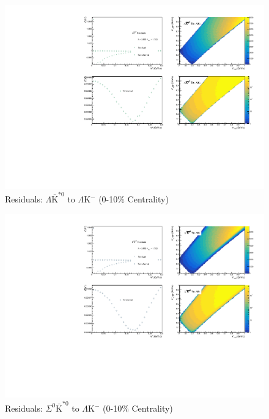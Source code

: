 \documentclass[../AnalysisNoteJBuxton.tex]{subfiles}
\begin{document}
\begin{figure}[h]
  \centering
  \includegraphics[width=\textwidth]{9_AdditionalFigures/Figures/Residuals/LamKchM/Residuals_LamKchM_0010_LamAKSt0_MomResCrctn_NonFlatBgdCrctn_10Res_PrimMaxDecay4fm_UsingXiDataAndCoulombOnly.pdf}
  \caption[Residuals: $\Lambda\bar{\mathrm{K}}^{*0}$ to $\Lambda$K$^{-}$ (0-10\% Centrality)]{Residuals: $\Lambda\bar{\mathrm{K}}^{*0}$ to $\Lambda$K$^{-}$ (0-10\% Centrality)}
  \label{fig:Res_LamKchM_0010_LamAKSt0}
\end{figure}


\begin{figure}[h]
  \centering
  \includegraphics[width=\textwidth]{9_AdditionalFigures/Figures/Residuals/LamKchM/Residuals_LamKchM_0010_Sig0AKSt0_MomResCrctn_NonFlatBgdCrctn_10Res_PrimMaxDecay4fm_UsingXiDataAndCoulombOnly.pdf}
  \caption[Residuals: $\Sigma^{0}\bar{\mathrm{K}}^{*0}$ to $\Lambda$K$^{-}$ (0-10\% Centrality)]{Residuals: $\Sigma^{0}\bar{\mathrm{K}}^{*0}$ to $\Lambda$K$^{-}$ (0-10\% Centrality)}
  \label{fig:Res_LamKchM_0010_Sig0AKSt0}
\end{figure}
\end{document}
